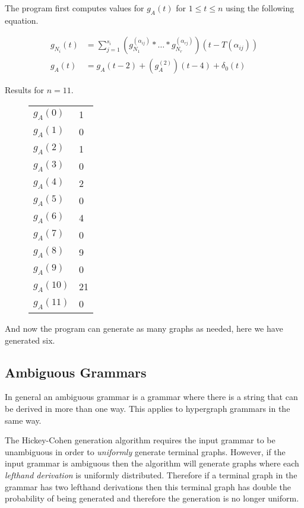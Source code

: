 



The program first computes values for $g_A(t)$ for $1 \leq t \leq n$ using the following equation.

\begin{align*}
  g_{N_i}(t) &= \sum_{j=1}^{s_i} \left(g_{N_1}^{(\alpha_{ij})} * \hdots * g_{N_r}^{(\alpha_{rj})}\right)(t - T(\alpha_{ij})) \\
  g_A(t) &= g_A(t-2) + (g_A^{(2)})(t-4) + \delta_0(t)
\end{align*}

Results for $n=11$.

\begin{figure}[!h]
\centering
\begin{tabular}{l|l}
$g_A(0)$ & 1 \\
$g_A(1)$ & 0 \\
$g_A(2)$ & 1 \\
$g_A(3)$ & 0 \\
$g_A(4)$ & 2 \\
$g_A(5)$ & 0 \\
$g_A(6)$ & 4 \\
$g_A(7)$ & 0 \\
$g_A(8)$ & 9 \\
$g_A(9)$ & 0 \\
$g_A(10)$ & 21 \\
$g_A(11)$ & 0 \\
\end{tabular}
\end{figure}

And now the program can generate as many graphs as needed, here we have generated six.



\subsection{Ambiguous Grammars}

In general an ambiguous grammar is a grammar where there is a string that can be derived in more than one way. This applies to hypergraph grammars in the same way.

The Hickey-Cohen generation algorithm requires the input grammar to be unambiguous in order to \emph{uniformly} generate terminal graphs. However, if the input grammar is ambiguous then the algorithm will generate graphs where each \emph{lefthand derivation} is uniformly distributed. Therefore if a terminal graph in the grammar has two lefthand derivations then this terminal graph has double the probability of being generated and therefore the generation is no longer uniform.

